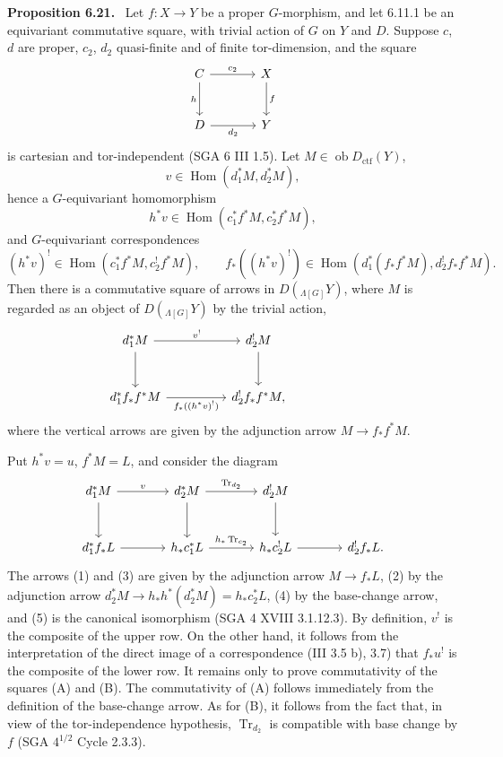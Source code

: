 \documentclass[11pt]{article}
\newenvironment{statement}[1]{\par\medskip\noindent\textbf{#1.}\ }{\par\medskip}
\DeclareMathOperator{\Hom}{Hom}
\providecommand{\Tr}{\operatorname{Tr}}
\providecommand{\Tr}{\operatorname{Tr}}
\providecommand{\Ob}{\operatorname{ob}}
\providecommand{\Tr}{\operatorname{Tr}}
\providecommand{\Hom}{\operatorname{Hom}}
\providecommand{\Ob}{\operatorname{ob}}
\providecommand{\Tr}{\operatorname{Tr}}
\providecommand{\Ob}{\operatorname{Ob}}
\begin{document}
\begin{statement}{Proposition 6.21}
Let $f:X\to Y$ be a proper $G$-morphism, and let 6.11.1 be an equivariant commutative square, with trivial action of $G$ on $Y$ and $D$. Suppose $c$, $d$ are proper, $c_2$, $d_2$ quasi-finite and of finite tor-dimension, and the square
\[
\begin{tikzcd}[column sep=large,row sep=large]
C \arrow[r,"c_2"] \arrow[d,"h"'] & X \arrow[d,"f"]\\
D \arrow[r,"d_2"'] & Y
\end{tikzcd}
\]
is cartesian and tor-independent (SGA 6 III 1.5). Let $M\in\Ob D_{\mathrm{ctf}}(Y)$,
\[
v\in\Hom(d_1^*M,d_2^*M),
\]
hence a $G$-equivariant homomorphism
\[
h^*v\in\Hom(c_1^*f^*M,c_2^*f^*M),
\]
and $G$-equivariant correspondences
\[
(h^*v)^!\in\Hom(c_1^*f^*M,c_2^!f^*M),
\qquad
f_*((h^*v)^!)\in\Hom(d_1^*(f_*f^*M),d_2^!f_*f^*M).
\]
Then there is a commutative square of arrows in $D({}_{\Lambda[G]}Y)$, where $M$ is regarded as an object of $D({}_{\Lambda[G]}Y)$ by the trivial action,
\[
\begin{tikzcd}[column sep=huge,row sep=large]
d_1^*M \arrow[r,"v^!"] \arrow[d] & d_2^!M \arrow[d] & {}\\
d_1^*f_*f^*M \arrow[r,"f_*((h^*v)^!)"'] & d_2^!f_*f^*M,
\end{tikzcd}
\]
where the vertical arrows are given by the adjunction arrow $M\to f_*f^*M$.
\end{statement}

Put $h^*v=u$, $f^*M=L$, and consider the diagram
\[
\begin{tikzcd}[column sep=large,row sep=large]
d_1^*M \arrow[r,"v"] \arrow[d] &
d_2^*M \arrow[r,"\Tr_{d_2}"] \arrow[d] &
d_2^!M \arrow[d] & {}\\
d_1^*f_*L \arrow[r] &
h_*c_1^*L \arrow[r,"h_*\Tr_{c_2}"] &
h_*c_2^!L \arrow[r] &
d_2^!f_*L .
\end{tikzcd}
\]
The arrows (1) and (3) are given by the adjunction arrow $M\to f_*L$, (2) by the adjunction arrow $d_2^*M\to h_*h^*(d_2^*M)=h_*c_2^*L$, (4) by the base-change arrow, and (5) is the canonical isomorphism (SGA 4 XVIII 3.1.12.3). By definition, $v^!$ is the composite of the upper row. On the other hand, it follows from the interpretation of the direct image of a correspondence (III 3.5 b), 3.7) that $f_*u^!$ is the composite of the lower row. It remains only to prove commutativity of the squares (A) and (B). The commutativity of (A) follows immediately from the definition of the base-change arrow. As for (B), it follows from the fact that, in view of the tor-independence hypothesis, $\Tr_{d_2}$ is compatible with base change by $f$ (SGA $4^{1/2}$ Cycle 2.3.3).
\end{document}
